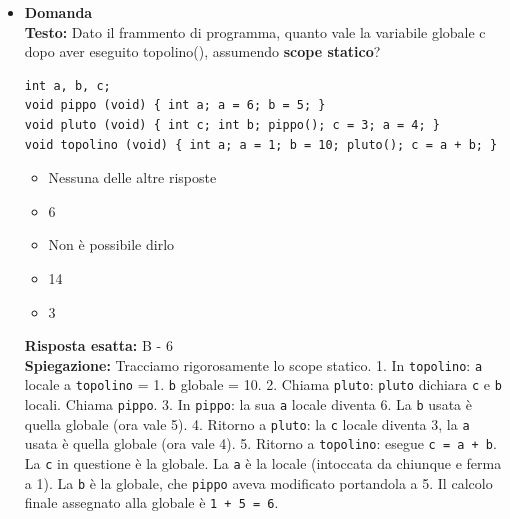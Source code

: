\documentclass[12pt, a4paper]{article}
\newcounter{domandateoria}
\begin{document}
\begin{itemize}
    \item {}\textbf{Domanda \thedomandateoria} \\
    \textbf{Testo:} Dato il frammento di programma, quanto vale la variabile globale c dopo aver eseguito topolino(), assumendo \textbf{scope statico}?
\begin{verbatim}
int a, b, c;
void pippo (void) { int a; a = 6; b = 5; }
void pluto (void) { int c; int b; pippo(); c = 3; a = 4; }
void topolino (void) { int a; a = 1; b = 10; pluto(); c = a + b; }
\end{verbatim}
    \begin{itemize}
        \item[A)] Nessuna delle altre risposte
        \item[B)] 6
        \item[C)] Non è possibile dirlo
        \item[D)] 14
        \item[E)] 3
    \end{itemize}
    \textbf{Risposta esatta:} B - 6 \\
    \textbf{Spiegazione:} Tracciamo rigorosamente lo scope statico.
    1. In \texttt{topolino}: \texttt{a} locale a \texttt{topolino} = 1. \texttt{b} globale = 10.
    2. Chiama \texttt{pluto}: \texttt{pluto} dichiara \texttt{c} e \texttt{b} locali. Chiama \texttt{pippo}.
    3. In \texttt{pippo}: la sua \texttt{a} locale diventa 6. La \texttt{b} usata è quella globale (ora vale 5).
    4. Ritorno a \texttt{pluto}: la \texttt{c} locale diventa 3, la \texttt{a} usata è quella globale (ora vale 4).
    5. Ritorno a \texttt{topolino}: esegue \texttt{c = a + b}. La \texttt{c} in questione è la globale. La \texttt{a} è la locale (intoccata da chiunque e ferma a 1). La \texttt{b} è la globale, che \texttt{pippo} aveva modificato portandola a 5. Il calcolo finale assegnato alla globale è \texttt{1 + 5 = 6}.
    \vspace{0.3cm}


\end{itemize}
\end{document}
